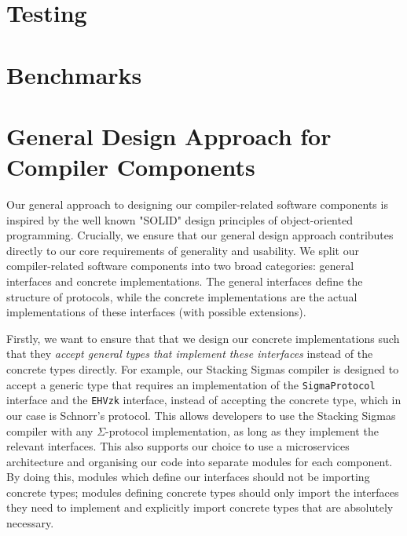 \section{Testing}\label{design:testing}


\section{Benchmarks}\label{design:bench}
 

\section{General Design Approach for Compiler Components}\label{design:approach}
Our general approach to designing our compiler-related software components is inspired by the 
well known "SOLID" design principles \cite{martin2000design} of object-oriented programming. 
Crucially, we ensure that our general design approach contributes directly to our core requirements 
of generality and usability. We split our compiler-related software components into two broad categories: 
general interfaces 
and concrete implementations. The general interfaces define the structure of protocols, while the 
concrete implementations are the actual implementations of these interfaces (with possible extensions).

Firstly, we want to ensure that that we design our concrete implementations such that 
they \textit{accept general types that implement these interfaces} instead of the concrete 
types directly.
For example, our Stacking Sigmas compiler is designed to 
accept a generic type that requires an implementation of the \texttt{SigmaProtocol} interface and the 
\texttt{EHVzk} interface, instead of accepting the concrete type, which in our case is Schnorr's protocol. 
This allows developers to use the Stacking Sigmas compiler with any $\Sigma$-protocol implementation, as 
long as they implement the relevant interfaces. This also supports our choice to use a 
microservices architecture and organising our code into separate modules for each component. 
By doing this, modules which define our interfaces should not be importing concrete types; modules 
defining concrete types should only import the interfaces they need to implement and explicitly 
import concrete types that are absolutely necessary. 


